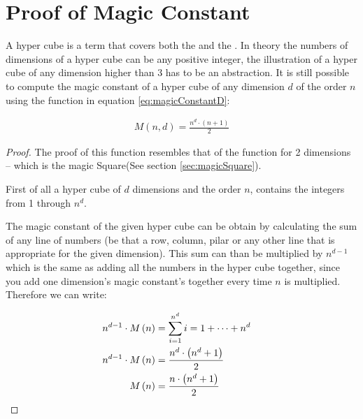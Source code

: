 \section{Proof of Magic Constant}
\label{sec:proofOfMagicConstant}
\begin{theorem}
	A hyper cube is a term that covers both the \msquare{} and the \mcube{}. In theory the numbers of dimensions of a hyper cube can be any positive integer, the illustration of a hyper cube of any dimension higher than 3 has to be an abstraction. It is still possible to compute the magic constant of a hyper cube of any dimension $d$ of the order $n$ using the function in equation \ref{eq:magicConstantD}:

	\begin{align}
	\label{eq:magicConstantD}
		M \left( n,d \right) = \frac{n^d \cdot \left( n+1 \right)}{2}
	\end{align}
\end{theorem}
\begin{proof}
	The proof of this function resembles that of the function for 2 dimensions -- which is the magic Square(See section \ref{sec:magicSquare}).
	
	First of all a hyper cube of $d$ dimensions and the order $n$, contains the integers from 1 through $n^d$.
	
	The magic constant of the given hyper cube can be obtain by calculating the sum of any line of numbers (be that a row, column, pilar or any other line that is appropriate for the given dimension). This sum can than be multiplied by $n^{d-1}$ which is the same as adding all the numbers in the hyper cube together, since you add one dimension's magic constant's together every time $n$ is multiplied. Therefore we can write:
	
	\begin{align*}
		n^{d-1} \cdot M \left( n \right) & = \sum ^{n^d}_{i = 1} i = 1 + \cdots + n^d \\
		n^{d-1} \cdot M \left( n \right) & = \frac{n^d \cdot \left( n^d + 1 \right)}{2} \\
		M \left( n \right) & = \frac{n \cdot \left( n^d + 1 \right)}{2} & \qedhere
	\end{align*}
\end{proof}